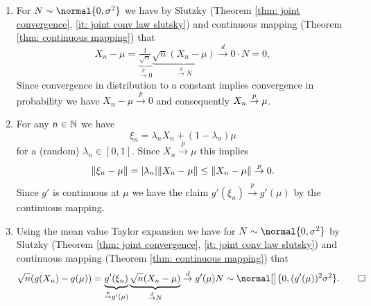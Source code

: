 \begin{solution}
    \begin{enumerate}[wide=0pt]
        \item[\ref{it: (delta-method) X_n to mu}] For \(N\sim \normal{0,\sigma^2}\) we have 
        by Slutzky (Theorem \ref{thm: joint convergence}, \ref{it: joint conv law slutsky})
        and continuous mapping (Theorem \ref{thm: continuous mapping}) that
        \[
            X_n -\mu
            = \underbrace{\tfrac1{\sqrt{n}}}_{\overset{p}\to 0}
            \underbrace{\sqrt{n}(X_n - \mu)}_{\overset{d}\to N}
            \overset{d}\to 0 \cdot N = 0,
        \]
        Since convergence in distribution to a constant implies convergence in probability
        we have \(X_n - \mu\overset{p}\to 0\) and consequently \(X_n \overset{p}\to \mu\).

        \item[\ref{it: (delta-method) taylor expansion}] For any \(n\in \mathbb{N}\) we
        have
        \[
            \xi_n = \lambda_n X_n + (1-\lambda_n)\mu
        \]
        for a (random) \(\lambda_n \in [0,1]\). Since \(X_n \overset{p}\to
        \mu\) this implies 
        \[
            \lVert\xi_n - \mu\rVert
            = \lvert\lambda_n\rvert \lVert X_n - \mu\rVert
            \le \lVert X_n - \mu\rVert
            \overset{p}\to 0.
        \]
        Since \(g'\) is continuous at \(\mu\) we have the claim \(g'(\xi_n)
        \overset{p}\to g'(\mu)\) by the continuous mapping.
        
        \item[\ref{it: (delta-method) proof}] Using the mean value Taylor
        expansion we have for \(N\sim \normal{0, \sigma^2}\)
        by Slutzky (Theorem \ref{thm: joint convergence}, \ref{it: joint conv law slutsky})
        and continuous mapping (Theorem \ref{thm: continuous mapping}) that
        \[
            \sqrt{n}(g(X_n) - g(\mu))
            = \underbrace{g'(\xi_n)}_{\overset{p}\to g'(\mu)} \underbrace{\sqrt{n}(X_n - \mu)}_{\overset{d}\to N}
            \overset{d}\to g'(\mu) N \sim \normal[\big]{0, (g'(\mu))^2\sigma^2}. 
            \qedhere
        \]
    \end{enumerate}
\end{solution}
